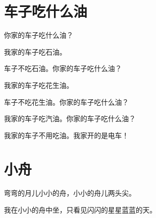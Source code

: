 \documentclass[12pt,UTF-8,openany]{ctexbook}
\begin{document}
\hanzibox{}\hanzibox{}\hanzibox{}\hanzibox{}\hspace{1em}\hanzibox{}\hanzibox{}\hanzibox{}\hanzibox{}

\hanzibox{}\hanzibox{}\hanzibox{}\hanzibox{}\hspace{1em}\hanzibox{}\hanzibox{}\hanzibox{}\hanzibox{}






\chapter{车子吃什么油}

\begin{large}
    
    你家的车子吃什么油？
    
    我家的车子吃石油。
    
    车子不吃石油。你家的车子吃什么油？
    
    我家的车子吃花生油。
    
    车子不吃花生油。你家的车子吃什么油？
    
    我家的车子吃汽油。你家的车子吃什么油？
    
    我家的车子不用吃油。我家开的是电车！
    
\end{large}


\clearpage

\begin{center}
    
\end{center}


\hanzibox{}\hanzibox{}\hanzibox{}\hanzibox{}\hspace{1em}\hanzibox{}\hanzibox{}\hanzibox{}\hanzibox{}

\hanzibox{}\hanzibox{}\hanzibox{}\hanzibox{}\hspace{1em}\hanzibox{}\hanzibox{}\hanzibox{}\hanzibox{}






\chapter{小舟}

\begin{large}
    
    弯弯的月儿小小的舟，小小的舟儿两头尖。
    
    我在小小的舟中坐，只看见闪闪的星星蓝蓝的天。
    
\end{large}
\end{document}
